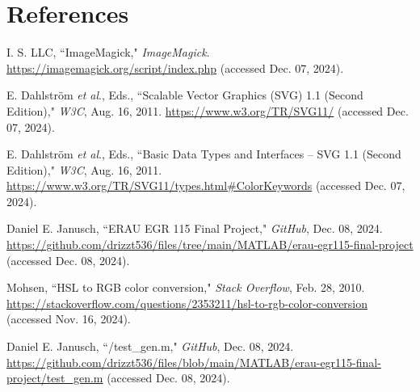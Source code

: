 \documentclass[12pt]{article}
\begin{document}
\section{References}

\begin{enumerate}[label={[1]}]
	\item I. S. LLC, ``ImageMagick," {\it ImageMagick}.
	\url{https://imagemagick.org/script/index.php}
	(accessed Dec. 07, 2024).
	\label{imagemagick}
\end{enumerate}
\vspace{-20px}
\begin{enumerate}[label={[2]}]
	\item E. Dahlstr\"om {\it et al}., Eds., ``Scalable Vector Graphics (SVG) 1.1
	(Second Edition)," {\it W3C}, Aug. 16, 2011. \url{https://www.w3.org/TR/SVG11/}
	(accessed Dec. 07, 2024).
	\label{svg docs}
\end{enumerate}
\vspace{-20px}
\begin{enumerate}[label={[3]}]
	\item E. Dahlstr\"om {\it et al}., Eds., ``Basic Data Types and Interfaces –
	SVG 1.1 (Second Edition)," {\it W3C}, Aug. 16, 2011.
	\url{https://www.w3.org/TR/SVG11/types.html#ColorKeywords}
	(accessed Dec. 07, 2024).
	\label{svg named colors}
\end{enumerate}
\vspace{-20px}
\begin{enumerate}[label={[4]}]
	\item Daniel E. Janusch, ``ERAU EGR 115 Final Project," {\it GitHub},
	Dec. 08, 2024.
	\url{https://github.com/drizzt536/files/tree/main/MATLAB/erau-egr115-final-project}
	(accessed Dec. 08, 2024).
	\label{code folder}
\end{enumerate}
\vspace{-20px}
\begin{enumerate}[label={[5]}]
	\item Mohsen, ``HSL to RGB color conversion," {\it Stack Overflow}, Feb. 28, 2010.
	\url{https://stackoverflow.com/questions/2353211/hsl-to-rgb-color-conversion}
	(accessed Nov. 16, 2024).
	\label{hsl2rgb}
\end{enumerate}
\vspace{-20px}
\begin{enumerate}[label={[6]}]
	\item Daniel E. Janusch, ``/test\_gen.m," {\it GitHub}, Dec. 08, 2024.
	\url{https://github.com/drizzt536/files/blob/main/MATLAB/erau-egr115-final-project/test_gen.m}
	(accessed Dec. 08, 2024).
	\label{test suite}
\end{enumerate}
\end{document}
